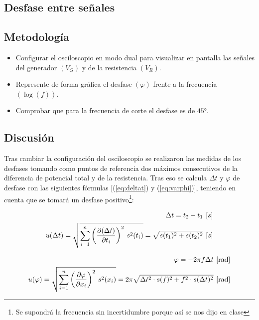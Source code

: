 \documentclass[11pt]{report}
\begin{document}
\begin{refsection}
\section{\textbf{Desfase entre señales}}
\subsection{Metodología}

\begin{itemize}
    \item Configurar el osciloscopio en modo dual para visualizar en pantalla las señales del 
    generador $(V_G)$ y de la resistencia $(V_R)$.
    \item Represente de forma gráfica el desfase $(\varphi)$ frente a la frecuencia $(\log(f))$.
    \item Comprobar que para la frecuencia de corte el desfase es de $45\unit{\degree}$.
\end{itemize}

\subsection{Discusión}

Tras cambiar la configuración del osciloscopio se realizaron las medidas de los desfases tomando como puntos de referencia dos máximos consecutivos
de la diferencia de potencial total y de la resistencia. Tras eso se calcula $\Delta t$ y $\varphi$ de desfase con las siguientes fórmulas 
[(\ref{eq:deltat}) y (\ref{eq:varphi})], teniendo en cuenta que se tomará un desfase 
positivo\footnote{Se supondrá la frecuencia sin incertidumbre porque así se nos dijo en clase}:

\begin{equation}
\begin{split}
    \Delta t = t_2 - t_1 \hspace{4pt} [s] \\
    u(\Delta t)=\sqrt{\sum^n_{i=1} \left( \frac{\partial (\Delta t)}{\partial t_i} \right)^2\hspace{2 pt} s^2(t_i)}=\sqrt{s(t_1)^2+s(t_2)^2}
     \hspace{4pt}[s]
    \label{eq:deltat}
\end{split}
\end{equation}

\begin{equation}
\begin{split}
    \varphi = -2\pi f\Delta t \hspace{4pt} [\unit{\radian}] \\
    u(\varphi)=\sqrt{\sum^n_{i=1} \left( \frac{\partial \varphi}{\partial x_i} \right)^2\hspace{2 pt} s^2(x_i)}=
    2\pi \sqrt{\Delta t^2\cdot s(f)^2+f^2\cdot s(\Delta t)^2}
    \hspace{4pt}[\unit{\radian}]
    \label{eq:varphi}
\end{split}
\end{equation}


\end{refsection}
\end{document}
